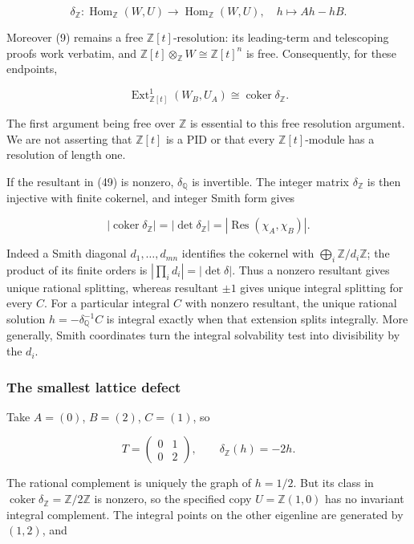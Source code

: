 \documentclass[
  11pt,
]{article}
\begin{document}
\[\delta_{\mathbb Z}:\operatorname{Hom}_{\mathbb Z}(W,U)
\longrightarrow\operatorname{Hom}_{\mathbb Z}(W,U),\quad
h\longmapsto Ah-hB.\tag{50}\]

Moreover (9) remains a free \(\mathbb Z[t]\)-resolution: its
leading-term and telescoping proofs work verbatim, and
\(\mathbb Z[t]\otimes_{\mathbb Z}W\cong\mathbb Z[t]^n\) is free.
Consequently, for these endpoints,

\[\operatorname{Ext}^1_{\mathbb Z[t]}(W_B,U_A)
\cong\operatorname{coker}\delta_{\mathbb Z}.\tag{51}\]

The first argument being free over \(\mathbb Z\) is essential to this
free resolution argument. We are not asserting that \(\mathbb Z[t]\) is
a PID or that every \(\mathbb Z[t]\)-module has a resolution of length
one.

If the resultant in (49) is nonzero, \(\delta_{\mathbb Q}\) is
invertible. The integer matrix \(\delta_{\mathbb Z}\) is then injective
with finite cokernel, and integer Smith form gives

\[\left|\operatorname{coker}\delta_{\mathbb Z}\right|
=|\det\delta_{\mathbb Z}|
=|\operatorname{Res}(\chi_A,\chi_B)|.\tag{52}\]

Indeed a Smith diagonal \(d_1,\ldots,d_{mn}\) identifies the cokernel
with \(\bigoplus_i\mathbb Z/d_i\mathbb Z\); the product of its finite
orders is \(|\prod_i d_i|=|\det\delta|\). Thus a nonzero resultant gives
unique rational splitting, whereas resultant \(\pm1\) gives unique
integral splitting for every \(C\). For a particular integral \(C\) with
nonzero resultant, the unique rational solution
\(h=-\delta_{\mathbb Q}^{-1}C\) is integral exactly when that extension
splits integrally. More generally, Smith coordinates turn the integral
solvability test into divisibility by the \(d_i\).

\subsubsection{The smallest lattice
defect}\label{the-smallest-lattice-defect}

Take \(A=(0)\), \(B=(2)\), \(C=(1)\), so

\[T=\begin{pmatrix}0&1\\0&2\end{pmatrix},\qquad
\delta_{\mathbb Z}(h)=-2h.\tag{53}\]

The rational complement is uniquely the graph of \(h=1/2\). But its
class in \(\operatorname{coker}\delta_{\mathbb Z}=\mathbb Z/2\mathbb Z\)
is nonzero, so the specified copy \(U=\mathbb Z(1,0)\) has no invariant
integral complement. The integral points on the other eigenline are
generated by \((1,2)\), and
\end{document}
